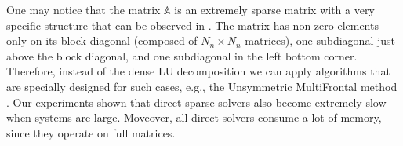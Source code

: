 One may notice that the matrix $\mathbb{A}$ is an extremely sparse matrix with a very specific structure that can be observed in . The matrix has non-zero elements only on its block diagonal (composed of $N_n \times N_n$ matrices), one subdiagonal just above the block diagonal, and one subdiagonal in the left bottom corner. Therefore, instead of the dense LU decomposition we can apply algorithms that are specially designed for such cases, e.g., the Unsymmetric MultiFrontal method \cite{umfpack2004}. Our experiments shown that direct sparse solvers also become extremely slow when systems are large. Moveover, all direct solvers consume a lot of memory, since they operate on full matrices.
